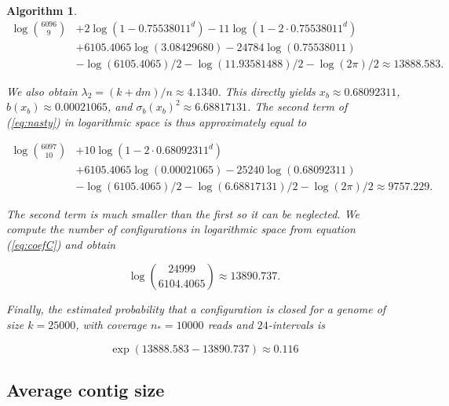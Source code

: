\documentclass{article}
\newtheorem{algorithm}{Algorithm}
\begin{document}
\begin{algorithm}
\begin{equation*}
\begin{split}
\log { 6096 \choose 9 } &+ 2\log(1-0.75538011^d)
-11\log(1-2\cdot0.75538011^d) \\
&+ 6105.4065\log(3.08429680) - 24784\log(0.75538011) \\
&- \log(6105.4065)/2 - \log(11.93581488)/2 - \log(2\pi)/2
\approx 13888.583.
\end{split}
\end{equation*}

We also obtain $\lambda_2 = (k+dm)/n \approx 4.1340$. This directly yields
$x_b \approx 0.68092311$, $b(x_b) \approx 0.00021065$, and
$\sigma_b(x_b)^2 \approx 6.68817131$. The second term of (\ref{eq:nasty})
in logarithmic space is thus approximately equal to

\begin{equation*}
\begin{split}
\log { 6097 \choose 10 } &+ 10\log(1-2\cdot0.68092311^d) \\
&+ 6105.4065\log(0.00021065) - 25240\log(0.68092311) \\
&- \log(6105.4065)/2 - \log(6.68817131)/2 - \log(2\pi)/2
\approx 9757.229.
\end{split}
\end{equation*}

The second term is much smaller than the first so it can be neglected.
We compute the number of configurations in logarithmic space from equation
(\ref{eq:coefC}) and obtain

\begin{equation*}
\log { 24999 \choose 6104.4065} \approx 13890.737.
\end{equation*}

Finally, the estimated probability that a configuration is closed for a
genome of size $k=25000$, with coverage $n_* = 10000$ reads and
$24$-intervals is

\begin{equation*}
\exp(13888.583-13890.737) \approx 0.116
\end{equation*}


\end{algorithm}


\subsection{Average contig size}
\label{subsec:avctsz}
\end{document}
